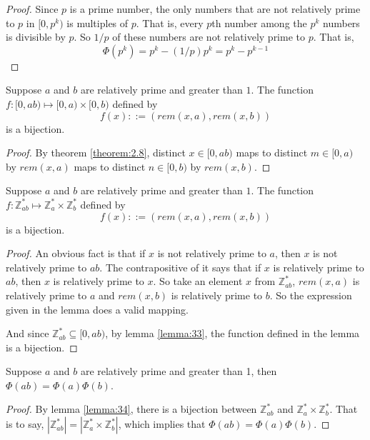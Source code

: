 \documentclass[11pt]{article}
\newcommand{\Zs}{\mathbb{Z}^\ast}
\begin{document}
\begin{proof}
Since $p$ is a prime number, the only numbers that are not relatively prime to $p$ in
$[0, p^k)$ is multiples of $p$. That is, every $p$th number among the $p^k$ numbers is
divisible by $p$. So $1/p$ of these numbers are not relatively prime to $p$. That is,
\[
  \Phi(p^k) = p^k - (1/p)p^k = p^k - p^{k-1}
\]
\end{proof}

\begin{lemma} \label{lemma:33}
Suppose $a$ and $b$ are relatively prime and greater than $1$. The function $f:[0,ab)
\mapsto [0,a) \times [0, b)$ defined by
\[
  f(x) ::= (rem(x,a), rem(x,b))
\]
is a bijection.
\end{lemma}

\begin{proof}
By theorem \ref{theorem:2.8}, distinct $x \in [0, ab)$ maps to distinct $m \in [0,a)$ by
$rem(x,a)$ maps to distinct $n \in [0,b)$ by $rem(x,b)$.
\end{proof}

\begin{lemma} \label{lemma:34}
Suppose $a$ and $b$ are relatively prime and greater than $1$. The function $f:\Zs_{ab}
\mapsto \Zs_a \times \Zs_b$ defined by
\[
  f(x) ::=(rem(x,a),rem(x,b))
\]
is a bijection.
\end{lemma}

\begin{proof}
An obvious fact is that if $x$ is not relatively prime to $a$, then $x$ is not relatively
prime to $ab$. The contrapositive of it says that if $x$ is relatively prime to $ab$, then
$x$ is relatively prime to $x$. So take an element $x$ from $\Zs_{ab}$, $rem(x,a)$ is
relatively prime to $a$ and $rem(x,b)$ is relatively prime to $b$. So the expression given
in the lemma does a valid mapping.

And since $\Zs_{ab} \subseteq [0,ab)$, by lemma \ref{lemma:33}, the function defined in the
lemma is a bijection.
\end{proof}

\begin{theorem} \label{theorem:35}
Suppose $a$ and $b$ are relatively prime and greater than 1, then
$\Phi(ab) = \Phi(a)\Phi(b)$.
\end{theorem}

\begin{proof}
By lemma \ref{lemma:34}, there is a bijection between $\Zs_{ab}$ and $\Zs_a \times \Zs_b$. That is to say, $|\Zs_{ab}|=|\Zs_a \times \Zs_b|$, which implies that
$\Phi(ab)=\Phi(a)\Phi(b)$.
\end{proof}
\end{document}
